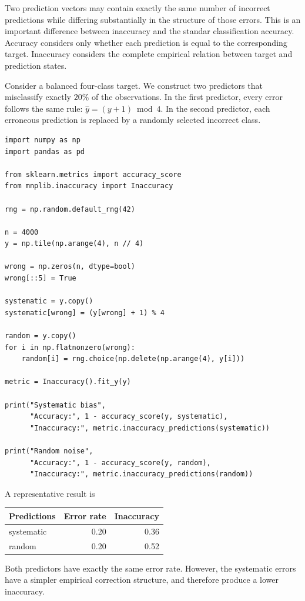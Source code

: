 Two prediction vectors may contain exactly the same number of incorrect predictions while differing substantially in the structure of those errors. This is an important difference between inaccuracy and the standar classification accuracy. Accuracy considers only whether each prediction is equal to the corresponding target. Inaccuracy considers the complete empirical relation between target and prediction states.

\begin{example}
\label{ex:machine_learning:inaccuracy:structured_errors}

Consider a balanced four-class target. We construct two predictors that misclassify exactly $20\%$ of the observations. In the first predictor, every error follows the same rule: $\hat y=(y+1)\bmod 4$. In the second predictor, each erroneous prediction is replaced by a randomly selected incorrect class.

\begin{sourcecode}
{\scriptsize \begin{verbatim}
import numpy as np
import pandas as pd

from sklearn.metrics import accuracy_score
from mnplib.inaccuracy import Inaccuracy

rng = np.random.default_rng(42)

n = 4000
y = np.tile(np.arange(4), n // 4)

wrong = np.zeros(n, dtype=bool)
wrong[::5] = True

systematic = y.copy()
systematic[wrong] = (y[wrong] + 1) % 4

random = y.copy()
for i in np.flatnonzero(wrong):
    random[i] = rng.choice(np.delete(np.arange(4), y[i]))

metric = Inaccuracy().fit_y(y)

print("Systematic bias",
      "Accuracy:", 1 - accuracy_score(y, systematic),
      "Inaccuracy:", metric.inaccuracy_predictions(systematic))

print("Random noise",
      "Accuracy:", 1 - accuracy_score(y, random),
      "Inaccuracy:", metric.inaccuracy_predictions(random))
\end{verbatim}}
\end{sourcecode}

A representative result is

\begin{center}
\begin{tabular}{lrr}
\hline
Predictions & Error rate & Inaccuracy \\
\hline
systematic & 0.20 & 0.36 \\
random     & 0.20 & 0.52 \\
\hline
\end{tabular}
\end{center}

Both predictors have exactly the same error rate. However, the systematic errors have a simpler empirical correction structure, and therefore produce a lower inaccuracy.
\end{example}

